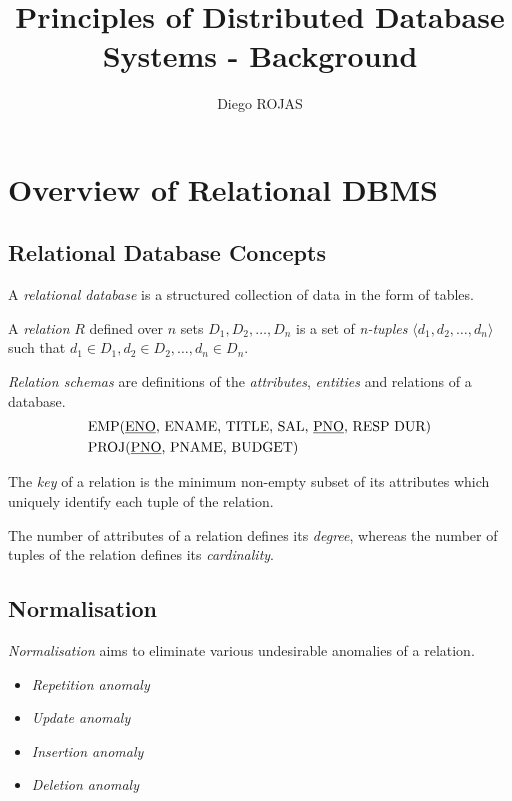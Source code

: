 \documentclass[12pt]{article}
\title{Principles of Distributed Database Systems - Background}
\author{Diego ROJAS}
\begin{document}
\maketitle
\tableofcontents

\section{Overview of Relational DBMS}

\subsection{Relational Database Concepts}

A \textit{relational database} is a structured collection of data in the form of tables.

A \textit{relation} $R$ defined over $n$ sets $D_1, D_2, \dots, D_n$ is a set of \textit{n-tuples} $\langle d_1, d_2, \dots, d_n \rangle$ such that $d_1 \in D_1, d_2 \in D_2, \dots, d_n \in D_n$.

\textit{Relation schemas} are definitions of the \textit{attributes}, \textit{entities} and relations of a database.
%
\begin{equation}
\begin{aligned}
	& \text{EMP(\underline{ENO}, ENAME, TITLE, SAL, \underline{PNO}, RESP DUR)} \\
	& \text{PROJ(\underline{PNO}, PNAME, BUDGET)}
\end{aligned}
\end{equation}

The \textit{key} of a relation is the minimum non-empty subset of its attributes which uniquely identify each tuple of the relation.

The number of attributes of a relation defines its \textit{degree}, whereas the number of tuples of the relation defines its \textit{cardinality}. 

\subsection{Normalisation}

\textit{Normalisation} aims to eliminate various undesirable anomalies of a relation.

\begin{itemize}
	\item \textit{Repetition anomaly}
	\item \textit{Update anomaly}
	\item \textit{Insertion anomaly}
	\item \textit{Deletion anomaly}
\end{itemize}
\end{document}
